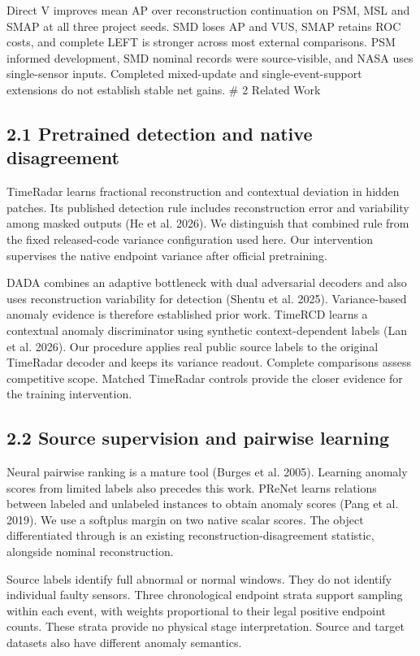 \documentclass[
  english,
  10pt,
]{article}
\begin{document}
Direct V improves mean AP over reconstruction continuation on PSM, MSL
and SMAP at all three project seeds. SMD loses AP and VUS, SMAP retains
ROC costs, and complete LEFT is stronger across most external
comparisons. PSM informed development, SMD nominal records were
source-visible, and NASA uses single-sensor inputs. Completed
mixed-update and single-event-support extensions do not establish stable
net gains. \# 2 Related Work

\subsection{2.1 Pretrained detection and native
disagreement}\label{pretrained-detection-and-native-disagreement}

TimeRadar learns fractional reconstruction and contextual deviation in
hidden patches. Its published detection rule includes reconstruction
error and variability among masked outputs (He et al. 2026). We
distinguish that combined rule from the fixed released-code variance
configuration used here. Our intervention supervises the native endpoint
variance after official pretraining.

DADA combines an adaptive bottleneck with dual adversarial decoders and
also uses reconstruction variability for detection (Shentu et al. 2025).
Variance-based anomaly evidence is therefore established prior work.
TimeRCD learns a contextual anomaly discriminator using synthetic
context-dependent labels (Lan et al. 2026). Our procedure applies real
public source labels to the original TimeRadar decoder and keeps its
variance readout. Complete comparisons assess competitive scope. Matched
TimeRadar controls provide the closer evidence for the training
intervention.

\subsection{2.2 Source supervision and pairwise
learning}\label{source-supervision-and-pairwise-learning}

Neural pairwise ranking is a mature tool (Burges et al. 2005). Learning
anomaly scores from limited labels also precedes this work. PReNet
learns relations between labeled and unlabeled instances to obtain
anomaly scores (Pang et al. 2019). We use a softplus margin on two
native scalar scores. The object differentiated through is an existing
reconstruction-disagreement statistic, alongside nominal reconstruction.

Source labels identify full abnormal or normal windows. They do not
identify individual faulty sensors. Three chronological endpoint strata
support sampling within each event, with weights proportional to their
legal positive endpoint counts. These strata provide no physical stage
interpretation. Source and target datasets also have different anomaly
semantics.
\end{document}
